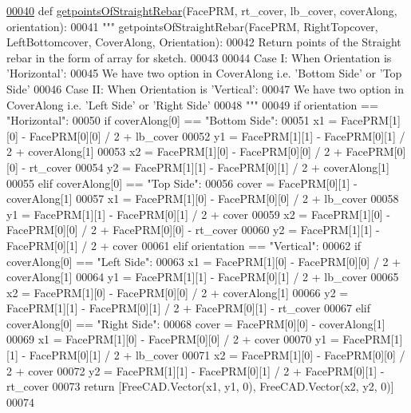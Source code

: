 \begin{DoxyCode}
\hypertarget{namespaceStraightRebar.tex_l00040}{}\hyperlink{namespaceStraightRebar_a1873c6f7f59b355a64fdd966ad75f778}{00040} \textcolor{keyword}{def }\hyperlink{namespaceStraightRebar_a1873c6f7f59b355a64fdd966ad75f778}{getpointsOfStraightRebar}(FacePRM, rt\_cover, lb\_cover, coverAlong, orientation):
00041     \textcolor{stringliteral}{""" getpointsOfStraightRebar(FacePRM, RightTopcover, LeftBottomcover, CoverAlong, Orientation):}
00042 \textcolor{stringliteral}{    Return points of the Straight rebar in the form of array for sketch.}
00043 \textcolor{stringliteral}{}
00044 \textcolor{stringliteral}{    Case I: When Orientation is 'Horizontal':}
00045 \textcolor{stringliteral}{        We have two option in CoverAlong i.e. 'Bottom Side' or 'Top Side'}
00046 \textcolor{stringliteral}{    Case II: When Orientation is 'Vertical':}
00047 \textcolor{stringliteral}{        We have two option in CoverAlong i.e. 'Left Side' or 'Right Side'}
00048 \textcolor{stringliteral}{    """}
00049     \textcolor{keywordflow}{if} orientation == \textcolor{stringliteral}{"Horizontal"}:
00050         \textcolor{keywordflow}{if} coverAlong[0] == \textcolor{stringliteral}{"Bottom Side"}:
00051             x1 = FacePRM[1][0] - FacePRM[0][0] / 2 + lb\_cover
00052             y1 = FacePRM[1][1] - FacePRM[0][1] / 2 + coverAlong[1]
00053             x2 = FacePRM[1][0] - FacePRM[0][0] / 2 + FacePRM[0][0] - rt\_cover
00054             y2 = FacePRM[1][1] - FacePRM[0][1] / 2 + coverAlong[1]
00055         \textcolor{keywordflow}{elif} coverAlong[0] == \textcolor{stringliteral}{"Top Side"}:
00056             cover = FacePRM[0][1] - coverAlong[1]
00057             x1 = FacePRM[1][0] - FacePRM[0][0] / 2 + lb\_cover
00058             y1 = FacePRM[1][1] - FacePRM[0][1] / 2 + cover
00059             x2 = FacePRM[1][0] - FacePRM[0][0] / 2 + FacePRM[0][0] - rt\_cover
00060             y2 = FacePRM[1][1] - FacePRM[0][1] / 2 + cover
00061     \textcolor{keywordflow}{elif} orientation == \textcolor{stringliteral}{"Vertical"}:
00062         \textcolor{keywordflow}{if} coverAlong[0] == \textcolor{stringliteral}{"Left Side"}:
00063             x1 = FacePRM[1][0] - FacePRM[0][0] / 2 + coverAlong[1]
00064             y1 = FacePRM[1][1] - FacePRM[0][1] / 2 + lb\_cover
00065             x2 = FacePRM[1][0] - FacePRM[0][0] / 2 + coverAlong[1]
00066             y2 = FacePRM[1][1] - FacePRM[0][1] / 2 + FacePRM[0][1] - rt\_cover
00067         \textcolor{keywordflow}{elif} coverAlong[0] == \textcolor{stringliteral}{"Right Side"}:
00068             cover = FacePRM[0][0] - coverAlong[1]
00069             x1 = FacePRM[1][0] - FacePRM[0][0] / 2 + cover
00070             y1 = FacePRM[1][1] - FacePRM[0][1] / 2 + lb\_cover
00071             x2 = FacePRM[1][0] - FacePRM[0][0] / 2 + cover
00072             y2 = FacePRM[1][1] - FacePRM[0][1] / 2 + FacePRM[0][1] - rt\_cover
00073     \textcolor{keywordflow}{return} [FreeCAD.Vector(x1, y1, 0), FreeCAD.Vector(x2, y2, 0)]
00074 
\end{DoxyCode}


